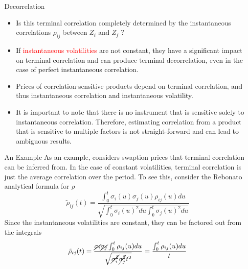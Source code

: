 \documentclass{beamer}
\begin{document}
\begin{frame}{Decorrelation}
\begin{itemize}
	\item Is this terminal correlation completely determined by the instantaneous correlations $\rho_{ij}$ between $Z_i$ and $Z_j$ ?
	\item If \textcolor{red}{instantaneous volatilities} are not constant, they have a significant impact on terminal correlation and can produce terminal decorrelation, even in the case of perfect instantaneous correlation.
	\item Prices of correlation-sensitive products depend on terminal correlation, and thus instantaneous correlation and instantaneous volatility. 
	\item It is important to note that there is no instrument that is sensitive solely to instantaneous correlation. Therefore, estimating correlation from a product that is sensitive to multiple factors is not straight-forward and can lead to ambiguous results.
\end{itemize}
\end{frame}

\begin{frame}{An Example}
As an example, considers swaption prices that terminal correlation can be inferred from.
In the case of constant volatilities, terminal correlation is just the average correlation over the period. To see this, consider the Rebonato analytical formula for $\rho$
\begin{equation*}
\tilde{\rho}_{ij}(t)=\frac{\int_0^t\sigma_i(u)\sigma_j(u)\rho_{ij}(u)du}{\sqrt{\int_0^t\sigma_i(u)^2 du\int_0^t\sigma_j(u)^2 du}}	
\end{equation*}
Since the instantaneous volatilities are constant, they can be factored out from the integrals
\begin{equation*}
\tilde{\rho}_{ij}(t)=\frac{\cancel{\sigma_i}\cancel{\sigma_j}\int_0^t\rho_{ij}(u)du}{\sqrt{\cancel{\sigma_i^2}\cancel{\sigma_j^2} t^2}}= \frac{\int_0^t\rho_{ij}(u)du}{t}		
\end{equation*}
\end{frame}
\end{document}
